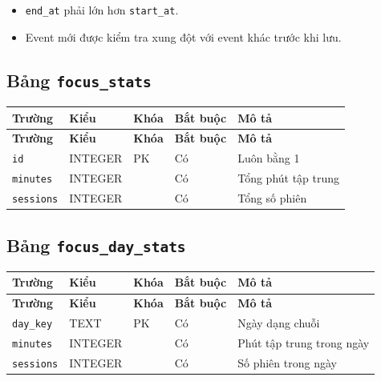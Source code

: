\documentclass[12pt,a4paper]{report}
\begin{document}
\begin{itemize}
\item \texttt{end\_at} phải lớn hơn \texttt{start\_at}.
\item Event mới được kiểm tra xung đột với event khác trước khi lưu.
\end{itemize}

\subsection{Bảng \texttt{focus\_stats}}

\begin{longtable}{|>{\raggedright\arraybackslash}p{}|>{\raggedright\arraybackslash}p{}|>{\raggedright\arraybackslash}p{}|>{\raggedright\arraybackslash}p{}|>{\raggedright\arraybackslash}p{}|}
\hline
\textbf{Trường} & \textbf{Kiểu} & \textbf{Khóa} & \textbf{Bắt buộc} & \textbf{Mô tả} \\ \hline
\endfirsthead
\hline
\textbf{Trường} & \textbf{Kiểu} & \textbf{Khóa} & \textbf{Bắt buộc} & \textbf{Mô tả} \\ \hline
\endhead
\texttt{id} & INTEGER & PK & Có & Luôn bằng 1 \\ \hline
\texttt{minutes} & INTEGER &  & Có & Tổng phút tập trung \\ \hline
\texttt{sessions} & INTEGER &  & Có & Tổng số phiên \\ \hline
\end{longtable}

\subsection{Bảng \texttt{focus\_day\_stats}}

\begin{longtable}{|>{\raggedright\arraybackslash}p{}|>{\raggedright\arraybackslash}p{}|>{\raggedright\arraybackslash}p{}|>{\raggedright\arraybackslash}p{}|>{\raggedright\arraybackslash}p{}|}
\hline
\textbf{Trường} & \textbf{Kiểu} & \textbf{Khóa} & \textbf{Bắt buộc} & \textbf{Mô tả} \\ \hline
\endfirsthead
\hline
\textbf{Trường} & \textbf{Kiểu} & \textbf{Khóa} & \textbf{Bắt buộc} & \textbf{Mô tả} \\ \hline
\endhead
\texttt{day\_key} & TEXT & PK & Có & Ngày dạng chuỗi \\ \hline
\texttt{minutes} & INTEGER &  & Có & Phút tập trung trong ngày \\ \hline
\texttt{sessions} & INTEGER &  & Có & Số phiên trong ngày \\ \hline
\end{longtable}
\end{document}

